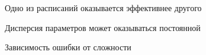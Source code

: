 \documentclass[12pt, twoside]{article}
\begin{document}
\begin{figure}[h!]
\caption{Одно из расписаний оказывается эффективнее другого}
\end{figure}
\begin{figure}[h!]
\caption{Дисперсия параметров может оказываться постоянной }
\end{figure}

\newpage

      \begin{figure}[h!]
\caption{Зависимость ошибки от сложности}
\end{figure}
\end{document}

